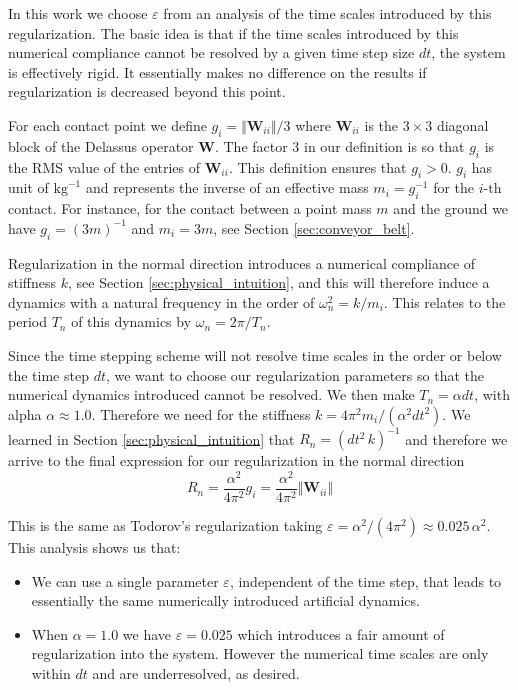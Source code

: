 In this work we choose $\varepsilon$ from an analysis of the time scales
introduced by this regularization. The basic idea is that if the time scales
introduced by this numerical compliance cannot be resolved by a given time step
size $dt$, the system is effectively rigid. It essentially makes no difference
on the results if regularization is decreased beyond this point. 

For each contact point we define $g_i=\Vert\mathbf{W}_{ii}\Vert/3$ where
$\mathbf{W}_{ii}$ is the $3\times 3$ diagonal block of the Delassus operator
$\mathbf{W}$. The factor $3$ in our definition is so that $g_i$ is the RMS value
of the entries of $\mathbf{W}_{ii}$. This definition ensures that $g_i > 0$.
$g_i$ has unit of $\text{kg}^{-1}$ and represents the inverse of an effective
mass $m_i=g_i^{-1}$ for the $i\text{-th}$ contact. For instance, for the contact
between a point mass $m$ and the ground we have $g_i=(3m)^{-1}$ and $m_i=3m$,
see Section \ref{sec:conveyor_belt}. 

Regularization in the normal direction introduces a numerical compliance of
stiffness $k$, see Section \ref{sec:physical_intuition}, and this will therefore
induce a dynamics with a natural frequency in the order of $\omega_n^2=k/m_i$.
This relates to the period $T_n$ of this dynamics by $\omega_n=2\pi/T_n$.

Since the time stepping scheme will not resolve time scales in the order or
below the time step $dt$, we want to choose our regularization parameters so
that the numerical dynamics introduced cannot be resolved. We then make $T_n =
\alpha dt$, with alpha $\alpha \approx 1.0$. Therefore we need for the stiffness
$k=4\pi^2m_i/(\alpha^2 dt^2)$. We learned in Section
\ref{sec:physical_intuition} that $R_n=(dt^2\,k)^{-1}$ and therefore we arrive
to the final expression for our regularization in the normal direction
\begin{equation}
	R_n = \frac{\alpha^2}{4\pi^2}g_i = \frac{\alpha^2}{4\pi^2}\Vert\mathbf{W}_{ii}\Vert
\end{equation}

This is the same as Todorov's regularization taking $\varepsilon =
\alpha^2/(4\pi^2)\approx 0.025\,\alpha^2$. This analysis shows us that:
\begin{itemize}
	\item We can use a single parameter $\varepsilon$, independent of the time
	step, that leads to essentially the same numerically introduced artificial
	dynamics. 
	\item When $\alpha=1.0$ we have $\varepsilon=0.025$ which introduces a fair
	amount of regularization into the system. However the numerical time scales
	are only within $dt$ and are underresolved, as desired.
\end{itemize}

